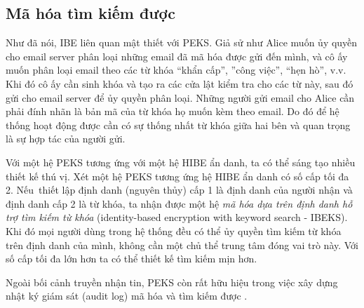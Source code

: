 \documentclass[class=report, crop=false]{standalone}
\begin{document}
		\subsection{Mã hóa tìm kiếm được}
			Như đã nói, IBE liên quan mật thiết với PEKS. Giả sử như Alice muốn ủy quyền cho email server phân loại những email đã mã hóa được gửi đến mình, và cô ấy muốn phân loại email theo các từ khóa ``khẩn cấp'', ''công việc'', ``hẹn hò'', v.v. Khi đó cô ấy cần sinh khóa và tạo ra các cửa lật kiểm tra cho các từ này, sau đó gửi cho email server để ủy quyền phân loại. Những người gửi email cho Alice cần phải đính nhãn là bản mã của từ khóa họ muốn kèm theo email. Do đó để hệ thống hoạt động được cần có sự thống nhất từ khóa giữa hai bên và quan trọng là sự hợp tác của người gửi.

			Với một hệ PEKS tương ứng với một hệ HIBE ẩn danh, ta có thể sáng tạo nhiều thiết kế thú vị. Xét một hệ PEKS tương ứng hệ HIBE ẩn danh có số cấp tối đa 2. Nếu~thiết lập định danh (nguyên thủy) cấp 1 là định danh của người nhận và định danh cấp 2 là từ khóa, ta nhận được một hệ \textit{mã hóa dựa trên định danh hỗ trợ tìm kiếm từ khóa} (identity-based encryption with keyword search - IBEKS). Khi đó mọi người dùng trong hệ thống đều có thể ủy quyền tìm kiếm từ khóa trên định danh của mình, không cần một chủ thể trung tâm đóng vai trò này. Với số cấp tối đa lớn hơn ta có thể thiết kế tìm kiếm mịn hơn.

			Ngoài bối cảnh truyền nhận tin, PEKS còn rất hữu hiệu trong việc xây dựng nhật ký giám sát (audit log) mã hóa và tìm kiếm được \cite{DBLP:conf/ndss/WatersBDS04}.
	\newpage
\end{document}
